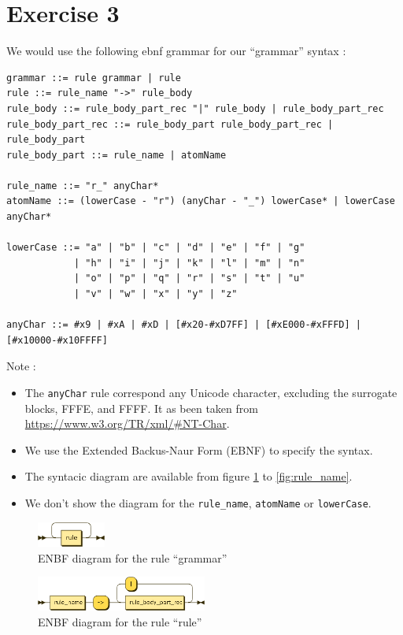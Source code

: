 \documentclass[a4paper,11pt]{report}
\newcommand{\ex}[3]{\prologfile[firstline=#1,lastline=#2]{#3.pl}}
\begin{document}
\ex{9}{73}{ex2_bis}

\newpage

\section*{Exercise 3}

We would use the following ebnf grammar for our ``grammar'' syntax :

\begin{verbatim}
grammar ::= rule grammar | rule
rule ::= rule_name "->" rule_body
rule_body ::= rule_body_part_rec "|" rule_body | rule_body_part_rec
rule_body_part_rec ::= rule_body_part rule_body_part_rec | rule_body_part
rule_body_part ::= rule_name | atomName

rule_name ::= "r_" anyChar*
atomName ::= (lowerCase - "r") (anyChar - "_") lowerCase* | lowerCase anyChar*

lowerCase ::= "a" | "b" | "c" | "d" | "e" | "f" | "g"
            | "h" | "i" | "j" | "k" | "l" | "m" | "n"
            | "o" | "p" | "q" | "r" | "s" | "t" | "u"
            | "v" | "w" | "x" | "y" | "z"

anyChar ::= #x9 | #xA | #xD | [#x20-#xD7FF] | [#xE000-#xFFFD] | [#x10000-#x10FFFF]
\end{verbatim}

Note :
\begin{itemize}
\item The \verb|anyChar| rule correspond any Unicode character, excluding the
  surrogate blocks, FFFE, and FFFF. It as been taken from
  \url{https://www.w3.org/TR/xml/#NT-Char}.
\item We use the Extended Backus-Naur Form (EBNF) to specify the syntax.
\item The syntacic diagram are available from figure \ref{fig:grammar} to
  \ref{fig:rule_name}.
\item We don't show the diagram for the \verb|rule_name|, \verb|atomName| or \verb|lowerCase|.
\end{itemize}

\begin{figure}[ht]
  \centering
  \includegraphics[width=0.2\textwidth]{figures/grammar}
  \caption{ENBF diagram for the rule ``grammar''}
  \label{fig:grammar}
\end{figure}

\begin{figure}[ht]
  \centering
  \includegraphics[width=0.5\textwidth]{figures/rule}
  \caption{ENBF diagram for the rule ``rule''}
  \label{fig:rule}
\end{figure}
\end{document}
